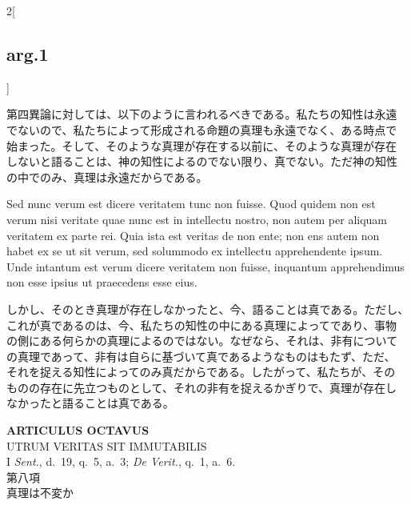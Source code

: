\documentclass[paper=a4paper,fontsize=10pt,jafontsize=9pt,titlepage]{jlreq}
\begin{document}
\begin{paracol}{2}[\subsection{arg.1}]
\switchcolumn

第四異論に対しては、以下のように言われるべきである。私たちの知性は永遠
でないので、私たちによって形成される命題の真理も永遠でなく、ある時点で
始まった。そして、そのような真理が存在する以前に、そのような真理が存在
しないと語ることは、神の知性によるのでない限り、真でない。ただ神の知性
の中でのみ、真理は永遠だからである。

\switchcolumn*


Sed nunc verum est dicere veritatem tunc non fuisse. Quod quidem non
est verum nisi veritate quae nunc est in intellectu nostro, non autem
per aliquam veritatem ex parte rei. Quia ista est veritas de non ente;
non ens autem non habet ex se ut sit verum, sed solummodo ex
intellectu apprehendente ipsum. Unde intantum est verum dicere
veritatem non fuisse, inquantum apprehendimus non esse ipsius ut
praecedens esse eius.

\switchcolumn

しかし、そのとき真理が存在しなかったと、今、語ることは真である。ただし、
これが真であるのは、今、私たちの知性の中にある真理によってであり、事物
の側にある何らかの真理によるのではない。なぜなら、それは、非有について
の真理であって、非有は自らに基づいて真であるようなものはもたず、ただ、
それを捉える知性によってのみ真だからである。したがって、私たちが、その
ものの存在に先立つものとして、それの非有を捉えるかぎりで、真理が存在し
なかったと語ることは真である。

\end{paracol}
\newpage

{}
\setcounter{section}{8}
\setcounter{subsection}{0}
\begin{center}
 {\Large {\bfseries ARTICULUS OCTAVUS}}\\
 {\large UTRUM VERITAS SIT IMMUTABILIS}\\
 {\footnotesize I {\itshape Sent.}, d.~19, q.~5, a.~3; {\itshape De
 Verit.}, q.~1, a.~6.}\\
 {\Large 第八項\\真理は不変か}
\end{center}
\end{document}

